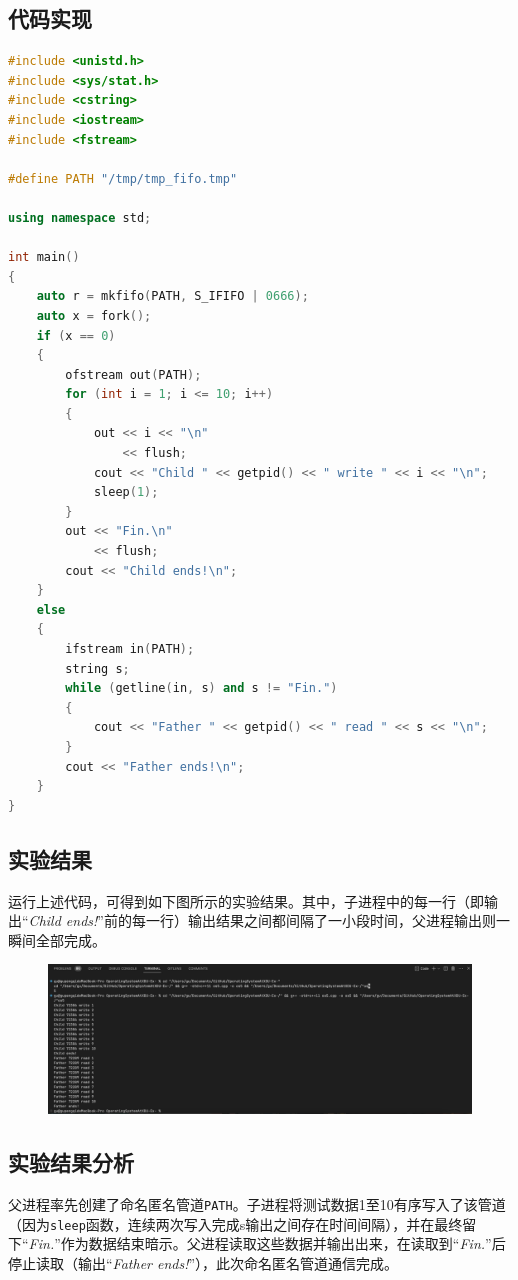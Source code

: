 \documentclass[UTF8]{ctexart}
\begin{document}
\subsection{代码实现}
\begin{lstlisting}[language=c++]
#include <unistd.h>
#include <sys/stat.h>
#include <cstring>
#include <iostream>
#include <fstream>

#define PATH "/tmp/tmp_fifo.tmp"

using namespace std;

int main()
{
    auto r = mkfifo(PATH, S_IFIFO | 0666);
    auto x = fork();
    if (x == 0)
    {
        ofstream out(PATH);
        for (int i = 1; i <= 10; i++)
        {
            out << i << "\n"
                << flush;
            cout << "Child " << getpid() << " write " << i << "\n";
            sleep(1);
        }
        out << "Fin.\n"
            << flush;
        cout << "Child ends!\n";
    }
    else
    {
        ifstream in(PATH);
        string s;
        while (getline(in, s) and s != "Fin.")
        {
            cout << "Father " << getpid() << " read " << s << "\n";
        }
        cout << "Father ends!\n";
    }
}
\end{lstlisting}
\subsection{实验结果}
运行上述代码，可得到如下图所示的实验结果。其中，子进程中的每一行（即输出“\textit{Child ends!}”前的每一行）输出结果之间都间隔了一小段时间，父进程输出则一瞬间全部完成。
\begin{figure}[htbp]
	\begin{center}
		\includegraphics[width=0.8\pdfpagewidth]{os5.png}
	\end{center}
\end{figure}
\subsection{实验结果分析}
父进程率先创建了命名匿名管道\texttt{PATH}。子进程将测试数据1至10有序写入了该管道（因为\texttt{sleep}函数，连续两次写入完成s输出之间存在时间间隔），并在最终留下“\textit{Fin.}”作为数据结束暗示。父进程读取这些数据并输出出来，在读取到“\textit{Fin.}”后停止读取（输出“\textit{Father ends!}”），此次命名匿名管道通信完成。
\end{document}
